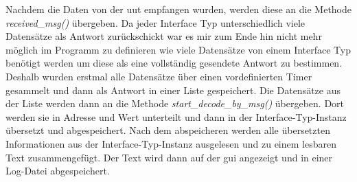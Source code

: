 Nachdem die Daten von der \ac{uut} empfangen wurden, werden diese an die Methode \textit{received\_msg()} übergeben. Da jeder Interface Typ unterschiedlich viele Datensätze als Antwort zurückschickt war es mir zum Ende hin nicht mehr möglich im Programm zu definieren wie viele Datensätze von einem Interface Typ benötigt werden um diese als eine vollständig gesendete Antwort zu bestimmen. Deshalb wurden erstmal alle Datensätze über einen vordefinierten Timer gesammelt und dann als Antwort in einer Liste gespeichert. Die Datensätze aus der Liste werden dann an die Methode \textit{start\_decode\_by\_msg()} übergeben. Dort werden sie in Adresse und Wert unterteilt und dann in der Interface-Typ-Instanz übersetzt und abgespeichert. Nach dem abspeicheren werden alle übersetzten Informationen aus der Interface-Typ-Instanz ausgelesen und zu einem lesbaren Text zusammengefügt. Der Text wird dann auf der \ac{gui} angezeigt und in einer Log-Datei abgespeichert.